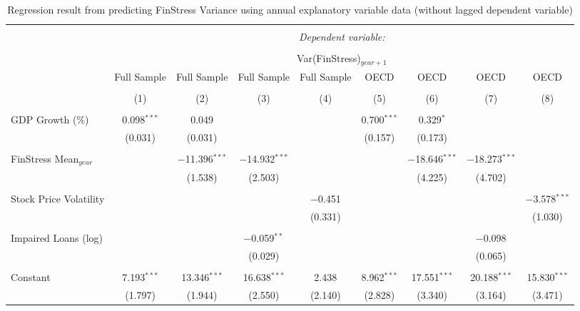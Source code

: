 
\begin{table}[!htbp] \centering 
  \caption{Regression result from predicting FinStress Variance using annual explanatory variable data (without lagged dependent variable)} 
  \label{annual_reg_nolag_dv} 
\tiny 
\begin{tabular}{@{\extracolsep{5pt}}lcccccccc} 
\\[-1.8ex]\hline 
\hline \\[-1.8ex] 
 & \multicolumn{8}{c}{\textit{Dependent variable:}} \\ 
\cline{2-9} 
\\[-1.8ex] & \multicolumn{8}{c}{Var(FinStress)$_{year+1}$} \\ 
 & Full Sample & Full Sample & Full Sample & Full Sample & OECD & OECD & OECD & OECD \\ 
\\[-1.8ex] & (1) & (2) & (3) & (4) & (5) & (6) & (7) & (8)\\ 
\hline \\[-1.8ex] 
 GDP Growth (\%) & 0.098$^{***}$ & 0.049 &  &  & 0.700$^{***}$ & 0.329$^{*}$ &  &  \\ 
  & (0.031) & (0.031) &  &  & (0.157) & (0.173) &  &  \\ 
  & & & & & & & & \\ 
 FinStress Mean$_{year}$ &  & $-$11.396$^{***}$ & $-$14.932$^{***}$ &  &  & $-$18.646$^{***}$ & $-$18.273$^{***}$ &  \\ 
  &  & (1.538) & (2.503) &  &  & (4.225) & (4.702) &  \\ 
  & & & & & & & & \\ 
 Stock Price Volatility &  &  &  & $-$0.451 &  &  &  & $-$3.578$^{***}$ \\ 
  &  &  &  & (0.331) &  &  &  & (1.030) \\ 
  & & & & & & & & \\ 
 Impaired Loans (log) &  &  & $-$0.059$^{**}$ &  &  &  & $-$0.098 &  \\ 
  &  &  & (0.029) &  &  &  & (0.065) &  \\ 
  & & & & & & & & \\ 
 Constant & 7.193$^{***}$ & 13.346$^{***}$ & 16.638$^{***}$ & 2.438 & 8.962$^{***}$ & 17.551$^{***}$ & 20.188$^{***}$ & 15.830$^{***}$ \\ 
  & (1.797) & (1.944) & (2.550) & (2.140) & (2.828) & (3.340) & (3.164) & (3.471) \\ 

\end{tabular}
\end{table}
